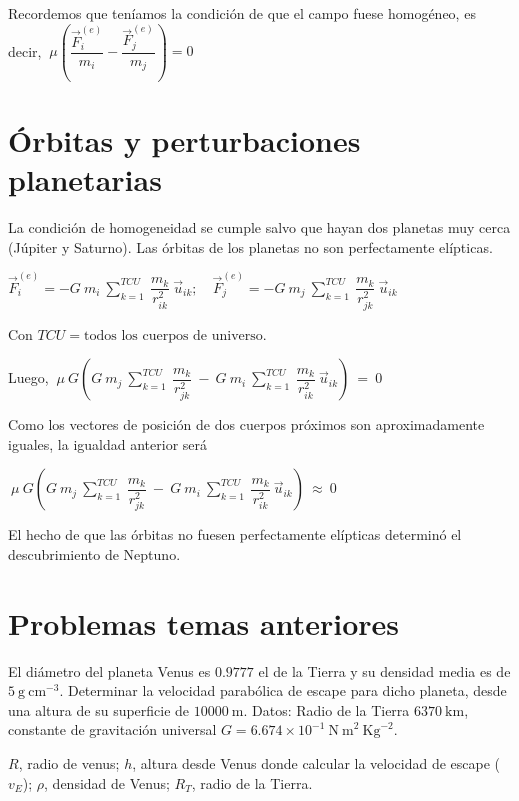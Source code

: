  
 Recordemos que teníamos la condición de que el campo fuese homogéneo, es decir, $\ \mu \left( \dfrac{\vec F_i^{(e)}}{m_i} - \dfrac{\vec F_j^{(e)}}{m_j} \right)=0$
 
\section{Órbitas y perturbaciones planetarias}
 
 La condición de homogeneidad se cumple salvo que hayan dos planetas muy cerca (Júpiter y Saturno). Las órbitas de los planetas no son perfectamente elípticas.
 
 $\displaystyle \vec  F_i^{(e)} = -G \ m_i \  \sum_{k=1}^{TCU} \  \dfrac{m_k}{r^2_{ik}} \ \vec u_{ik} ; \quad 
 \vec  F_j^{(e)} = -G \ m_j \  \sum_{k=1}^{TCU} \  \dfrac{m_k}{r^2_{jk}} \ \vec u_{ik}$
 
 Con $TCU=\text{todos los cuerpos de universo}.$
 
 Luego, $\ \displaystyle \mu \ G \left( G \ m_j \  \sum_{k=1}^{TCU} \  \dfrac{m_k}{r^2_{jk}} \ - \ G \ m_i \  \sum_{k=1}^{TCU} \  \dfrac{m_k}{r^2_{ik}} \ \vec u_{ik} \right)\ = \ 0  $
 
 Como los vectores de posición de dos cuerpos próximos son aproximadamente iguales, la igualdad anterior será 
 
  $\ \displaystyle \mu \ G \left( G \ m_j \  \sum_{k=1}^{TCU} \  \dfrac{m_k}{r^2_{jk}} \ - \ G \ m_i \  \sum_{k=1}^{TCU} \  \dfrac{m_k}{r^2_{ik}} \ \vec u_{ik} \right)\ \approx \ 0  $
  
  El hecho de que las órbitas no fuesen perfectamente elípticas determinó el descubrimiento de Neptuno.
  
\section{Problemas temas anteriores}

\begin{prob}
El diámetro del planeta Venus es $0.9777$ el de la Tierra y su densidad media es de $5\ \mathrm{g\ cm}^{-3}$. Determinar la velocidad parabólica de escape para dicho planeta, desde una altura de su superficie de $10000\ \textrm{m}$. Datos: Radio de la Tierra $6370\ \mathrm{km}$, constante de gravitación universal $G=6.674\times 10^{-1} \ \mathrm{N\ m}^2 \ \mathrm{Kg}^{-2}$.
\end{prob}

$R$, radio de venus; $h$, altura desde Venus donde calcular la velocidad de escape ($v_E$); $\rho$, densidad de Venus; $R_T$, radio de la Tierra.

